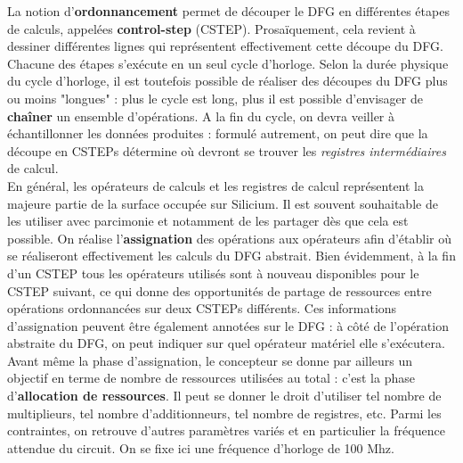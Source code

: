 \documentclass[a4paper,11pt]{exam}
\begin{document}
La notion d'\textbf{ordonnancement} permet de découper le DFG en différentes étapes de calculs, appelées \textbf{control-step} (CSTEP). Prosaïquement, cela revient à dessiner différentes lignes qui représentent effectivement cette découpe du DFG.\\

Chacune des étapes s'exécute en un seul cycle d'horloge. Selon la durée physique du cycle d'horloge, il est toutefois possible de réaliser des découpes du DFG plus ou moins "longues" : plus le cycle est long, plus il est possible d'envisager de \textbf{chaîner} un ensemble d'opérations. A la fin du cycle, on devra veiller à échantillonner les données produites : formulé autrement, on peut dire que la découpe en CSTEPs détermine où devront se trouver les \textit{registres intermédiaires} de calcul.\\

En général, les opérateurs de calculs et les registres de calcul représentent la majeure partie de la surface occupée sur Silicium. Il est souvent souhaitable de les utiliser avec parcimonie et notamment de les partager dès que cela est possible. On réalise l'\textbf{assignation} des opérations aux opérateurs afin d'établir où se réaliseront effectivement les calculs du DFG abstrait. Bien évidemment, à la fin d'un CSTEP tous les opérateurs utilisés sont à nouveau disponibles pour le CSTEP suivant, ce qui donne des opportunités de partage de ressources entre opérations ordonnancées sur deux CSTEPs différents. Ces informations d'assignation peuvent être également annotées sur le DFG : à côté de l'opération abstraite du DFG, on peut indiquer sur quel opérateur matériel elle s'exécutera.\\

Avant même la phase d'assignation, le concepteur se donne par ailleurs un objectif en terme de nombre de ressources utilisées au total : c'est la phase d'\textbf{allocation de ressources}. Il peut se donner le droit d'utiliser tel nombre de multiplieurs, tel nombre d'additionneurs, tel nombre de registres, etc. Parmi les contraintes, on retrouve d'autres paramètres variés et en particulier la fréquence attendue du circuit. On se fixe ici une fréquence d'horloge de 100 Mhz.
\end{document}
